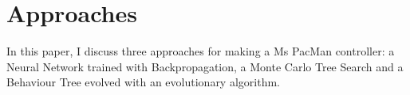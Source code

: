 \section{Approaches}
In this paper, I discuss three approaches for making a Ms PacMan controller: a Neural Network trained with Backpropagation, a Monte Carlo Tree Search and a Behaviour Tree evolved with an evolutionary algorithm.







